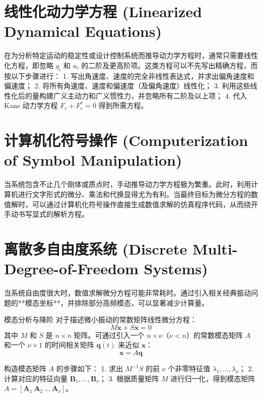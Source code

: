 \section{线性化动力学方程 (Linearized Dynamical Equations)}

在为分析特定运动的稳定性或设计控制系统而推导动力学方程时，通常只需要线性化方程，即忽略 \(q_i\) 和 \(u_i\) 的二阶及更高阶项。这类方程可以不先写出精确方程，而按以下步骤进行：
1. 写出角速度、速度的完全非线性表达式，并求出偏角速度和偏速度；
2. 将所有角速度、速度和偏速度（及偏角速度）线性化；
3. 利用这些线性化后的量构建广义主动力和广义惯性力，并忽略所有二阶及以上项；
4. 代入 Kane 动力学方程 \(F_r + F_r^* = 0\) 得到所需方程。

\section{计算机化符号操作 (Computerization of Symbol Manipulation)}

当系统包含不止几个刚体或质点时，手动推导动力学方程极为繁重。此时，利用计算机进行文字形式的微分、乘法和代换显得尤为有利。当最终目标为微分方程的数值解时，可以通过计算机化符号操作直接生成数值求解的仿真程序代码，从而绕开手动书写显式的解析方程。

\section{离散多自由度系统 (Discrete Multi-Degree-of-Freedom Systems)}

当系统自由度很大时，数值求解微分方程可能非常耗时。通过引入相关经典振动问题的**模态坐标**，并排除部分高频模态，可以显著减少计算量。

\begin{myTheorem}{模态分析与降阶}
对于描述微小振动的常数矩阵线性微分方程：
\begin{equation}
M\ddot{\mathbf{x}} + S\mathbf{x} = 0 \tag{1}
\end{equation}
其中 \(M\) 和 \(S\) 是 \(n \times n\) 矩阵。可通过引入一个 \(n \times \nu\)（\(\nu < n\)）的常数模态矩阵 \(A\) 和一个 \(\nu \times 1\) 的时间相关矩阵 \(\mathbf{q}(t)\) 来近似 \(\mathbf{x}\)：
\begin{equation}
\mathbf{x} = A\mathbf{q} \tag{2}
\end{equation}
\end{myTheorem}

构造模态矩阵 \(A\) 的步骤如下：
1. 求出 \(M^{-1}S\) 的前 \(\nu\) 个非零特征值 \(\lambda_1,\dots,\lambda_\nu\)；
2. 计算对应的特征向量 \(\mathbf{B}_1,\dots,\mathbf{B}_\nu\)；
3. 根据质量矩阵 \(M\) 进行归一化，得到模态矩阵 \(A = [\mathbf{A}_1\ \mathbf{A}_2\ \dots\ \mathbf{A}_\nu]\)。

